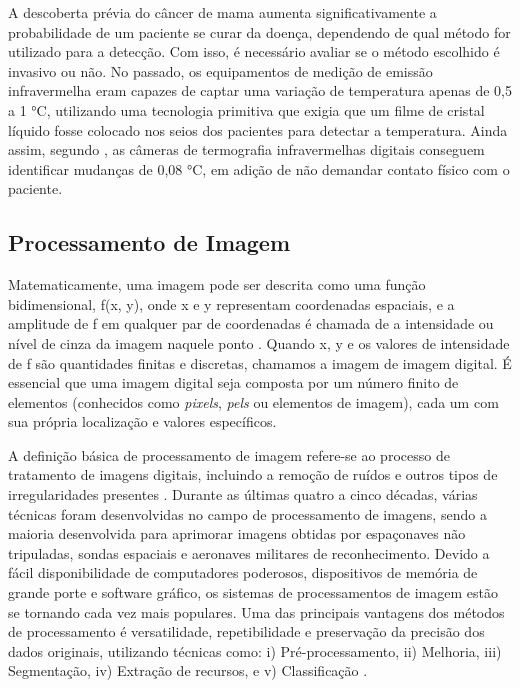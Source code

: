 A descoberta prévia do câncer de mama aumenta significativamente a probabilidade de um paciente se curar da doença, dependendo de qual método for utilizado para a detecção. Com isso, é necessário avaliar se o método escolhido é invasivo ou não. No passado, os equipamentos de medição de emissão infravermelha eram capazes de captar uma variação de temperatura apenas de 0,5 a 1 °C, utilizando uma tecnologia primitiva que exigia que um filme de cristal líquido fosse colocado nos seios dos pacientes para detectar a temperatura. Ainda assim, segundo , as câmeras de termografia infravermelhas digitais conseguem identificar mudanças de 0,08 °C, em adição de não demandar contato físico com o paciente.





\subsection{\esp Processamento de Imagem} \label{procesamentoimg}

Matematicamente, uma imagem pode ser descrita como uma função bidimensional, f(x, y), onde x e y representam coordenadas espaciais, e a amplitude de f em qualquer par de coordenadas é chamada de a intensidade ou nível de cinza da imagem naquele ponto \cite{techniques}. Quando x, y e os valores de intensidade de f são quantidades finitas e discretas, chamamos a imagem de imagem digital. É essencial que uma imagem digital seja composta por um número finito de elementos (conhecidos como \textit{pixels}, \textit{pels} ou elementos de imagem), cada um com sua própria localização e valores específicos. 

A definição básica de processamento de imagem refere-se ao processo de tratamento de imagens digitais, incluindo a remoção de ruídos e outros tipos de irregularidades presentes \cite{histopathological}. Durante as últimas quatro a cinco décadas, várias técnicas foram desenvolvidas no campo de processamento de imagens, sendo a maioria desenvolvida para aprimorar imagens obtidas por espaçonaves não tripuladas, sondas espaciais e aeronaves militares de reconhecimento. Devido a fácil disponibilidade de computadores poderosos, dispositivos de memória de grande porte e software gráfico, os sistemas de processamentos de imagem estão se tornando cada vez mais populares. Uma das principais vantagens dos métodos de processamento é versatilidade, repetibilidade e preservação da precisão dos dados originais, utilizando técnicas como: i) Pré-processamento, ii) Melhoria, iii) Segmentação, iv) Extração de recursos, e v) Classificação \cite{lungcancer}.


